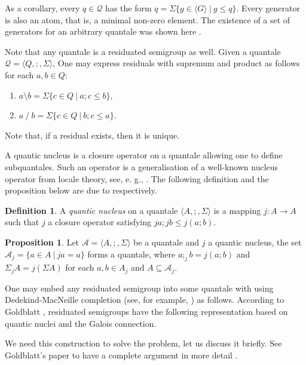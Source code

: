 \documentclass[a4paper]{article}
\theoremstyle{definition}
\newtheorem{definition}{Definition}
\theoremstyle{theorem}
\theoremstyle{proposition}
\newtheorem{proposition}{Proposition}
\theoremstyle{lemma}
\theoremstyle{ex}
\theoremstyle{corollary}
\theoremstyle{claim}
\begin{document}
As a corollary, every $q \in \mathcal{Q}$ has the form $q = \Sigma \{ g \in \langle G \rangle \: | \: g \leq q \}$. Every generator is also an atom, that is, a minimal non-zero element. The existence of a set of generators for an arbitrary quantale was shown here \cite[Lemma 3.12]{brown1993representation}.

Note that any quantale is a residuated semigroup as well. Given a quantale $\mathcal{Q} = \langle Q, ;, \Sigma \rangle$, One may express residuals with supremum and product as follows for each $a, b \in Q$:
\begin{enumerate}
  \item $a \setminus b = \Sigma \{ c \in Q \: | \: a ; c \leq b \}$,
  \item $a \: / \: b = \Sigma \{ c \in Q\: | \: b ; c \leq a \}$.
\end{enumerate}
Note that, if a residual exists, then it is unique.

A quantic nucleus is a closure operator on a quantale allowing one to define subquantales. Such an operator is a generalisation of a well-known nucleus operator from locale theory, see, e. g., \cite{bezhanishvili2016locales}. The following definition and the proposition below are due to \cite[Definition 3.1.1, Theorem 3.1.1]{rosenthal1990quantales} respectively.
\begin{definition}
  A \emph{quantic nucleus} on a quantale $\langle A, ;, \Sigma \rangle$ is a mapping $j : A \to A$ such that $j$ a closure operator satisfying $j a ; j b \leq j (a ; b)$.
\end{definition}

\begin{proposition} \label{subsemi}
  Let $\mathcal{A} = \langle A, ;, \Sigma \rangle$ be a quantale and $j$ a quantic nucleus, the set
  $\mathcal{A}_j = \{ a \in A \: | \: j a = a \}$ forms a quantale, where $a ;_j b = j(a ; b)$ and $\Sigma_j A = j (\Sigma A)$ for each $a, b \in {A}_j$ and $A \subseteq \mathcal{A}_j$.
\end{proposition}

One may embed any residuated semigroup into some quantale with using Dedekind-MacNeille completion (see, for example, \cite{theunissen2007macneille}) as follows. According to Goldblatt \cite{goldblatt2006kripke}, residuated semigroups have the following representation based on quantic nuclei and the Galois connection.

We need this construction to solve the problem, let us discuss it briefly. See Goldblatt's paper to have a complete argument in more detail \cite{goldblatt2006kripke}.
\end{document}
